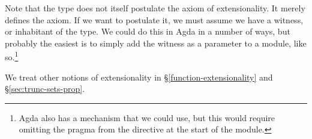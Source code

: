\ccpad
Note that the type  does not itself postulate the axiom of extensionality.  It merely defines the axiom.  If we want to postulate it, we must assume we have a witness, or inhabitant of the type. We could do this in Agda in a number of ways, but probably the easiest is to simply add the witness as a parameter to a module, like so.\footnote{Agda also has a  mechanism that we could use, but this would require omitting the  pragma from the  directive at the start of the module.}
\ccpad
\begin{code}
\>[0]\AgdaSpace{}%
\AgdaSpace{}%
\AgdaSymbol{\{}\AgdaSpace{}%
\AgdaSpace{}%
\AgdaSymbol{:}\AgdaSpace{}%
\AgdaSymbol{\}\{}\AgdaSpace{}%
\AgdaSymbol{:}\AgdaSpace{}%
\AgdaSpace{}%
\AgdaSymbol{\}}\AgdaSpace{}%
\AgdaSymbol{\{}\AgdaSpace{}%
\AgdaSymbol{:}\AgdaSpace{}%
\AgdaSpace{}%
\AgdaSpace{}%
\AgdaSymbol{\}}\AgdaSpace{}%
\<%
\end{code}
\ccpad
We treat other notions of extensionality in \S\ref{function-extensionality} and \S\ref{sec:trunc-sets-prop}.


